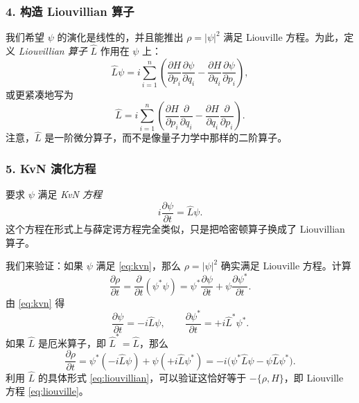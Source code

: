 ﻿\documentclass[10pt,a4paper]{article}
\numberwithin{equation}{section}
\begin{document}
\subsubsection*{4. 构造 Liouvillian 算子}

我们希望 $\psi$ 的演化是线性的，并且能推出 $\rho=|\psi|^2$ 满足 Liouville 方程。为此，定义 \emph{Liouvillian 算子} $\hat L$ 作用在 $\psi$ 上：
\begin{equation}
    \hat L \psi
    =
    i \sum_{i=1}^n
    \left(
        \frac{\partial H}{\partial p_i}\frac{\partial \psi}{\partial q_i}
        -
        \frac{\partial H}{\partial q_i}\frac{\partial \psi}{\partial p_i}
    \right),
    \label{eq:liouvillian}
\end{equation}
或更紧凑地写为
\begin{equation}
    \hat L
    =
    i \sum_{i=1}^n
    \left(
        \frac{\partial H}{\partial p_i}\frac{\partial}{\partial q_i}
        -
        \frac{\partial H}{\partial q_i}\frac{\partial}{\partial p_i}
    \right).
\end{equation}
注意，$\hat L$ 是一阶微分算子，而不是像量子力学中那样的二阶算子。

\subsubsection*{5. KvN 演化方程}

要求 $\psi$ 满足 \emph{KvN 方程}
\begin{equation}
    i \frac{\partial \psi}{\partial t} = \hat L \psi .
    \label{eq:kvn}
\end{equation}
这个方程在形式上与薛定谔方程完全类似，只是把哈密顿算子换成了 Liouvillian 算子。

我们来验证：如果 $\psi$ 满足 \eqref{eq:kvn}，那么 $\rho=|\psi|^2$ 确实满足 Liouville 方程。计算
\begin{equation}
    \frac{\partial \rho}{\partial t}
    =
    \frac{\partial}{\partial t}(\psi^*\psi)
    =
    \psi^*\frac{\partial \psi}{\partial t}
    +
    \psi\frac{\partial \psi^*}{\partial t}.
\end{equation}
由 \eqref{eq:kvn} 得
\begin{equation}
    \frac{\partial \psi}{\partial t} = -i\hat L\psi,
    \qquad
    \frac{\partial \psi^*}{\partial t} = +i\hat L^*\psi^* .
\end{equation}
如果 $\hat L$ 是厄米算子，即 $\hat L^*=\hat L$，那么
\begin{equation}
    \frac{\partial \rho}{\partial t}
    =
    \psi^*(-i\hat L\psi) + \psi(+i\hat L\psi^*)
    =
    -i\bigl(\psi^*\hat L\psi - \psi\hat L\psi^*\bigr).
\end{equation}
利用 $\hat L$ 的具体形式 \eqref{eq:liouvillian}，可以验证这恰好等于 $-\{\rho,H\}$，即 Liouville 方程 \eqref{eq:liouville}。
\end{document}
